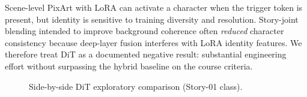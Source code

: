 Scene-level PixArt with LoRA can activate a character when the trigger token is present, but identity is sensitive to training diversity and resolution.
Story-joint blending intended to improve background coherence often \emph{reduced} character consistency because deep-layer fusion interferes with LoRA identity features.
We therefore treat DiT as a documented negative result: substantial engineering effort without surpassing the hybrid baseline on the course criteria.

\begin{figure}[!t]
  \centering
  \caption{Side-by-side DiT exploratory comparison (Story-01 class).}
  \label{fig:dit_vs_sdxl}
\end{figure}
